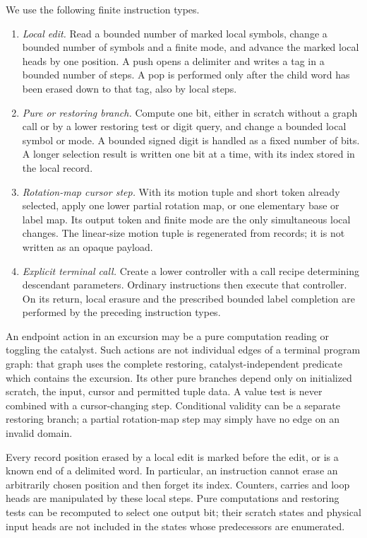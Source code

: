 We use the following finite instruction types.
\begin{enumerate}
\item \emph{Local edit.} Read a bounded number of marked local symbols,
  change a bounded number of symbols and a finite mode, and advance the
  marked local heads by one position.  A push opens a delimiter and
  writes a tag in a bounded number of steps.  A pop is performed only
  after the child word has been erased down to that tag, also by local
  steps.
\item \emph{Pure or restoring branch.} Compute one bit, either in scratch
  without a graph call or by a lower restoring test or digit query, and
  change a bounded local symbol or mode.  A bounded signed digit is
  handled as a fixed number of bits.  A longer selection result is
  written one bit at a time, with its index stored in the local record.
\item \emph{Rotation-map cursor step.} With its motion tuple and short token
  already selected, apply one lower partial rotation map, or one elementary
  base or label map.  Its output token and finite mode are the only
  simultaneous local changes.  The linear-size motion tuple is
  regenerated from records; it is not written as an opaque payload.
\item \emph{Explicit terminal call.} Create a lower controller with a
  call recipe determining descendant parameters.  Ordinary instructions then execute that
  controller.  On its return, local erasure and the prescribed bounded
  label completion are performed by the preceding instruction types.
\end{enumerate}
An endpoint action in an excursion may be a pure computation reading or
toggling the catalyst.  Such actions are not individual edges of a
terminal program graph: that graph uses the complete restoring,
catalyst-independent predicate which contains the excursion.  Its other
pure branches depend only on initialized scratch, the input, cursor and
permitted tuple data.  A value test is never combined with a cursor-changing
step.  Conditional validity can be a separate restoring branch; a
partial rotation-map step may simply have no edge on an invalid domain.

Every record position erased by a local edit is marked before the edit,
or is a known end of a delimited word.  In particular, an instruction
cannot erase an arbitrarily chosen position and then forget its index.
Counters, carries and loop heads are manipulated by these local steps.
Pure computations and restoring tests can be recomputed to select one
output bit; their scratch states and physical input heads are not
included in the states whose predecessors are enumerated.

